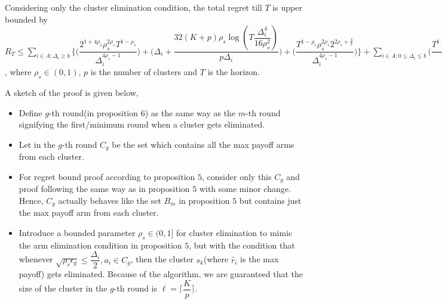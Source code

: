 \begin{proposition}
Considering only the cluster elimination condition, the total regret till $T$ is upper bounded by $R_{T}\leq \sum_{i\in A:\Delta_{i}\geq b}\bigg\lbrace\bigg(\dfrac{2^{1+4\rho_{s}}\rho_{s}^{2\rho_{s}}T^{1-\rho_{s}}}{\Delta_{i}^{4\rho_{s}-1}}\bigg) + \bigg(\Delta_{i}+\dfrac{32(K+p)\rho_{s}\log{(T\dfrac{\Delta_{i}^{4}}{16\rho_{s}^{2}})}}{p\Delta_{i}}\bigg)  +  \bigg(\dfrac{T^{1-\rho_{s}}\rho_{s}^{2\rho_{s}}2^{2\rho_{s}+\frac{3}{2}}}{\Delta_{i}^{4\rho_{s} -1}} \bigg) \bigg \rbrace+\sum_{i\in A:0\leq\Delta_{i}\leq b}\bigg(\dfrac{T^{1-\rho_{s}}\rho_{s}^{2\rho_{s}}2^{2\rho_{s}+\frac{3}{2}}}{b^{4\rho_{s} -1}} \bigg) + max_{i:\Delta\leq b}\Delta_{i}T$, where $\rho_{s}\in (0,1)$, $p$ is the number of clusters and $T$ is the horizon.
\end{proposition}


\begin{remark} A sketch of the proof is given below,
\newline
\begin{itemize}
\item Define $g$-th round(in proposition 6) as the same way as the $m$-th round signifying the first/minimum round when a cluster gets eliminated.
\item Let in the $g$-th round $C_{g}$ be the set which contains all the max payoff arms from each cluster.
\item For regret bound proof according to proposition $5$, consider only this $C_{g}$ and proof following the same way as in proposition $5$ with some minor change. Hence, $C_{g}$ actually behaves like the set $B_{m}$ in proposition $5$ but contains just the max payoff arm from each cluster.
\item Introduce a bounded parameter $\rho_{s}\in (0,1]$ for cluster elimination to mimic the arm elimination condition in proposition $5$, but with the condition that whenever $\sqrt{\rho_{s}\epsilon_{g}}\leq \dfrac{\Delta_{i}}{2}, a_{i}\in C_{g}$, then the cluster $s_{k}$(where $\hat{r}_{i}$ is the max payoff) gets eliminated. Because of the algorithm, we are guaranteed that the size of the cluster in the $g$-th round is $\ell=\bigg\lceil \dfrac{K}{p}\bigg\rceil$.
\end{itemize}
\end{remark}

